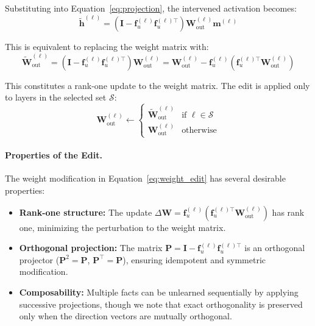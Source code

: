 Substituting into Equation~\ref{eq:projection}, the intervened activation becomes:
\begin{equation}
    \tilde{\mathbf{h}}^{(\ell)} = \left(\mathbf{I} - \mathbf{f}_u^{(\ell)} \mathbf{f}_u^{(\ell)\top}\right) \mathbf{W}_{\text{out}}^{(\ell)} \mathbf{m}^{(\ell)}
\end{equation}

This is equivalent to replacing the weight matrix with:
\begin{equation}
    \tilde{\mathbf{W}}_{\text{out}}^{(\ell)} = \left(\mathbf{I} - \mathbf{f}_u^{(\ell)} \mathbf{f}_u^{(\ell)\top}\right) \mathbf{W}_{\text{out}}^{(\ell)} = \mathbf{W}_{\text{out}}^{(\ell)} - \mathbf{f}_u^{(\ell)} \left(\mathbf{f}_u^{(\ell)\top} \mathbf{W}_{\text{out}}^{(\ell)}\right)
    \label{eq:weight_edit}
\end{equation}

This constitutes a rank-one update to the weight matrix. The edit is applied only to layers in the selected set $\mathcal{S}$:
\begin{equation}
    \mathbf{W}_{\text{out}}^{(\ell)} \leftarrow 
    \begin{cases}
        \tilde{\mathbf{W}}_{\text{out}}^{(\ell)} & \text{if } \ell \in \mathcal{S} \\
        \mathbf{W}_{\text{out}}^{(\ell)} & \text{otherwise}
    \end{cases}
\end{equation}

\paragraph{Properties of the Edit.}
The weight modification in Equation~\ref{eq:weight_edit} has several desirable properties:
\begin{itemize}
    \item \textbf{Rank-one structure:} The update $\Delta \mathbf{W} = \mathbf{f}_u^{(\ell)} \left(\mathbf{f}_u^{(\ell)\top} \mathbf{W}_{\text{out}}^{(\ell)}\right)$ has rank one, minimizing the perturbation to the weight matrix.
    \item \textbf{Orthogonal projection:} The matrix $\mathbf{P} = \mathbf{I} - \mathbf{f}_u^{(\ell)} \mathbf{f}_u^{(\ell)\top}$ is an orthogonal projector ($\mathbf{P}^2 = \mathbf{P}$, $\mathbf{P}^\top = \mathbf{P}$), ensuring idempotent and symmetric modification.
    \item \textbf{Composability:} Multiple facts can be unlearned sequentially by applying successive projections, though we note that exact orthogonality is preserved only when the direction vectors are mutually orthogonal.
\end{itemize}

